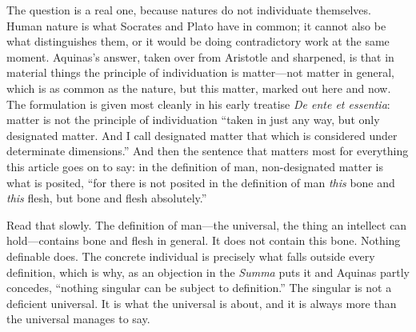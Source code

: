 The question is a real one, because natures do not individuate themselves. Human nature is what Socrates and Plato have in common; it cannot also be what distinguishes them, or it would be doing contradictory work at the same moment. Aquinas's answer, taken over from Aristotle and sharpened, is that in material things the principle of individuation is matter---not matter in general, which is as common as the nature, but this matter, marked out here and now. The formulation is given most cleanly in his early treatise \emph{De ente et essentia}: matter is not the principle of individuation ``taken in just any way, but only designated matter. And I call designated matter that which is considered under determinate dimensions.'' And then the sentence that matters most for everything this article goes on to say: in the definition of man, non-designated matter is what is posited, ``for there is not posited in the definition of man \emph{this} bone and \emph{this} flesh, but bone and flesh absolutely.''

Read that slowly. The definition of man---the universal, the thing an intellect can hold---contains bone and flesh in general. It does not contain this bone. Nothing definable does. The concrete individual is precisely what falls outside every definition, which is why, as an objection in the \emph{Summa} puts it and Aquinas partly concedes, ``nothing singular can be subject to definition.'' The singular is not a deficient universal. It is what the universal is about, and it is always more than the universal manages to say.

